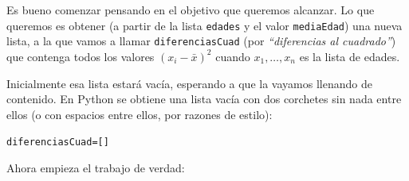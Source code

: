 \documentclass[10pt,a4paper]{article}\usepackage[]{graphicx}\usepackage[]{color}
\makeatletter
\newenvironment{kframe}{%
 \def\at@end@of@kframe{}%
 \ifinner\ifhmode%
  \def\at@end@of@kframe{\end{minipage}}%
  \begin{minipage}{\columnwidth}%
 \fi\fi%
 \def\FrameCommand##1{\hskip\@totalleftmargin \hskip-\fboxsep
 \colorbox{shadecolor}{##1}\hskip-\fboxsep
     \hskip-\linewidth \hskip-\@totalleftmargin \hskip\columnwidth}%
 \MakeFramed {\advance\hsize-\width
   \@totalleftmargin\z@ \linewidth\hsize
   \@setminipage}}%
 {\par\unskip\endMakeFramed%
 \at@end@of@kframe}
\newenvironment{knitrout}{}{} %
\newcounter {cont01}
\makeatother
\begin{document}
Es bueno comenzar pensando en el objetivo que queremos alcanzar. Lo que queremos es obtener (a partir de la lista {\tt edades} y el valor {\tt mediaEdad}) una nueva lista, a la que vamos a llamar {\tt diferenciasCuad} (por {\em ``diferencias al cuadrado''}) que contenga todos los valores $(x_i-\bar x)^2$ cuando $x_1,\ldots,x_n$ es la lista de edades.

Inicialmente esa lista estará vacía, esperando a que la vayamos llenando de contenido.  En Python se obtiene una lista vacía con dos corchetes sin nada entre ellos (o con espacios entre ellos, por razones de estilo):
\begin{knitrout}
\color{fgcolor}\begin{kframe}
\begin{alltt}
diferenciasCuad = [ ]
\end{alltt}
\end{kframe}
\end{knitrout}
Ahora empieza el trabajo de verdad:
\end{document}
